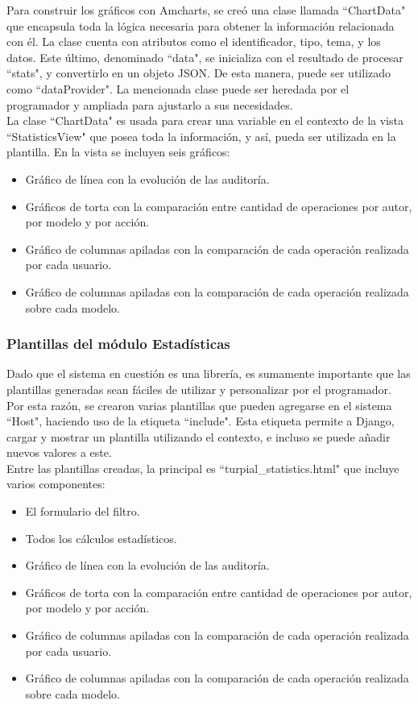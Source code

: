 Para construir los gráficos con Amcharts, se creó una clase llamada “ChartData" que encapsula toda la lógica necesaria para obtener la información relacionada con él. La clase cuenta con atributos como el identificador, tipo, tema, y los datos. Este último, denominado “data", se inicializa con el resultado de procesar “stats", y convertirlo en un objeto JSON. De esta manera, puede ser utilizado como “dataProvider". La mencionada clase puede ser heredada por el programador y ampliada para ajustarlo a sus necesidades.\\

La clase “ChartData" es usada para crear una variable en el contexto de la vista “StatisticsView" que posea toda la información, y así, pueda ser utilizada en la plantilla. En la vista se incluyen seis gráficos:

\begin{itemize}
    \item Gráfico de línea con la evolución de las auditoría.
    \item Gráficos de torta con la comparación entre cantidad de operaciones por autor, por modelo y por acción.
    \item Gráfico de columnas apiladas con la comparación de cada operación realizada por cada usuario.
    \item Gráfico de columnas apiladas con la comparación de cada operación realizada sobre cada modelo.
\end{itemize}


\subsubsection{Plantillas del módulo Estadísticas}

Dado que el sistema en cuestión es una librería, es sumamente importante que las plantillas generadas sean fáciles de utilizar y personalizar por el programador. Por esta razón, se crearon varias plantillas que pueden agregarse en el sistema “Host", haciendo uso de la etiqueta  “include". Esta etiqueta permite a Django, cargar y mostrar un plantilla utilizando el contexto, e incluso se puede añadir nuevos valores a este.\\

Entre las plantillas creadas, la principal es “turpial\_statistics.html" que incluye varios componentes:

\begin{itemize}
    \item El formulario del filtro.
    \item Todos los cálculos estadísticos.
    \item Gráfico de línea con la evolución de las auditoría.
    \item Gráficos de torta con la comparación entre cantidad de operaciones por autor, por modelo y por acción.
    \item Gráfico de columnas apiladas con la comparación de cada operación realizada por cada usuario.
    \item Gráfico de columnas apiladas con la comparación de cada operación realizada sobre cada modelo.
\end{itemize}

